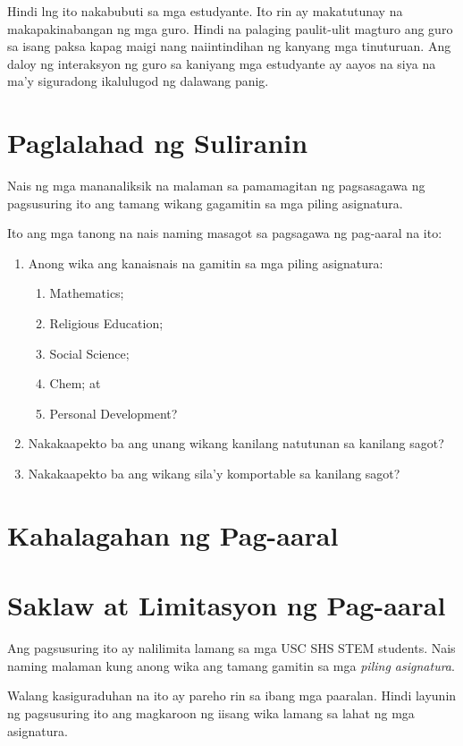 \documentclass [11pt] {report}
\begin{document}
Hindi lng ito nakabubuti sa mga estudyante. Ito rin ay makatutunay na
makapakinabangan ng mga guro. Hindi na palaging paulit-ulit magturo ang guro sa
isang paksa kapag maigi nang naiintindihan ng kanyang mga tinuturuan. Ang daloy
ng interaksyon ng guro sa kaniyang mga estudyante ay aayos na siya na ma’y
siguradong ikalulugod ng dalawang panig.

\pagebreak
\section {Paglalahad ng Suliranin}
Nais ng mga mananaliksik na malaman sa pamamagitan ng pagsasagawa ng pagsusuring
ito ang tamang wikang gagamitin sa mga piling asignatura.

Ito ang mga tanong na nais naming masagot sa pagsagawa ng pag-aaral na ito:

\begin{enumerate}[parsep=\baselineskip,itemsep=-0.5\baselineskip]
\item Anong wika ang kanaisnais na gamitin sa mga piling asignatura:
  \begin{enumerate}[nosep]
  \item Mathematics;
  \item Religious Education;
  \item Social Science;
  \item Chem; at
  \item Personal Development?
  \end{enumerate}
\item Nakakaapekto ba ang unang wikang kanilang natutunan sa kanilang sagot?
\item Nakakaapekto ba ang wikang sila'y komportable sa kanilang sagot?
\end{enumerate}

\section{Kahalagahan ng Pag-aaral}

\pagebreak
\section {Saklaw at Limitasyon ng Pag-aaral}
Ang pagsusuring ito ay nalilimita lamang sa mga USC SHS STEM students. Nais
naming malaman kung anong wika ang tamang gamitin sa mga \emph{piling
  asignatura}.

Walang kasiguraduhan na ito ay pareho rin sa ibang mga paaralan. Hindi layunin
ng pagsusuring ito ang magkaroon ng iisang wika lamang sa lahat ng mga
asignatura.
\end{document}
